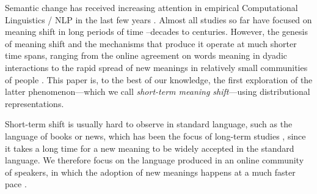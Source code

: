 Semantic change has received increasing attention in empirical Computational Linguistics / NLP in the last few years \cite{tang2018state,KutuzovEtal-coling2018}. Almost all studies so far have focused on meaning shift in long periods of time --decades to centuries. However, the genesis of meaning shift and the mechanisms that produce it operate at much shorter time spans, ranging
from the online agreement on words meaning in dyadic interactions \cite{brennan1996conceptual} to the rapid spread of new meanings in relatively small communities of people \cite{wenger1998communities,eckert-mcconnellginet1992}.
This paper is, to the best of our knowledge, the first exploration of the latter phenomenon---which we call \textit{short-term meaning shift}---using distributional representations.

Short-term shift is usually hard to observe in standard language, such
as the language of books or news, which has been the focus of
long-term studies \cite[e.g.,][]{hamilton2016diachronic,kulkarni2015statistically}, since
it takes a long time for a new meaning to be widely accepted in the standard language. 
We therefore focus on the language produced in an online community of speakers, in which the 
adoption of new meanings happens at a much faster pace \cite{Clark96,hasan2009}.



